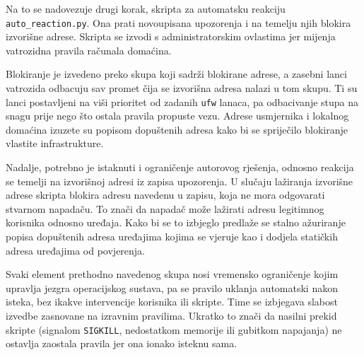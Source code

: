 Na to se nadovezuje drugi korak, skripta za automatsku reakciju \texttt{auto\_reaction.py}. Ona prati novoupisana upozorenja i na temelju njih blokira izvorišne adrese. 
Skripta se izvodi s administratorskim ovlastima jer mijenja vatrozidna pravila računala domaćina.

Blokiranje je izvedeno preko skupa  koji sadrži blokirane adrese, a zasebni lanci vatrozida odbacuju sav promet čija se izvorišna adresa nalazi u tom skupu. 
Ti su lanci postavljeni na viši prioritet od zadanih \texttt{ufw} lanaca, pa odbacivanje stupa na snagu prije nego što ostala pravila propuste vezu. Adrese usmjernika i 
lokalnog domaćina izuzete su popisom dopuštenih adresa  kako bi se spriječilo blokiranje vlastite infrastrukture.

Nadalje, potrebno je istaknuti i ograničenje autorovog rješenja, odnosno reakcija se temelji na izvorišnoj adresi iz zapisa upozorenja. U slučaju lažiranja izvorišne adrese
 skripta blokira adresu navedenu u zapisu, koja ne mora odgovarati stvarnom napadaču. To znači da napadač može lažirati adresu
legitimnog korisnika odnosno uređaja. Kako bi se to izbjeglo predlaže se stalno ažuriranje popisa dopuštenih adresa uređajima kojima se vjeruje kao i dodjela 
statičkih adresa uređajima od povjerenja.

Svaki element prethodno navedenog skupa nosi vremensko ograničenje  kojim upravlja jezgra operacijskog sustava, pa se pravilo uklanja automatski 
nakon isteka, bez ikakve intervencije korisnika ili skripte. Time se izbjegava slabost izvedbe zasnovane na izravnim pravilima. Ukratko to znači da nasilni 
prekid skripte (signalom \texttt{SIGKILL}, nedostatkom memorije ili gubitkom napajanja) ne ostavlja zaostala pravila jer ona ionako isteknu sama.